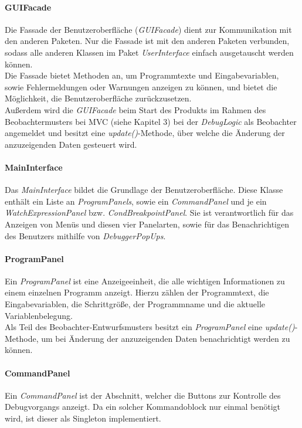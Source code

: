 \documentclass[parskip=full]{scrartcl}
\begin{document}
\paragraph{GUIFacade}
Die Fassade der Benutzeroberfläche (\textit{GUIFacade}) dient zur Kommunikation mit den anderen Paketen. Nur die Fassade ist mit den anderen Paketen verbunden, sodass alle anderen Klassen im Paket \textit{UserInterface} einfach ausgetauscht werden können. \\
Die Fassade bietet Methoden an, um Programmtexte und Eingabevariablen, sowie Fehlermeldungen oder Warnungen anzeigen zu können, und bietet die Möglichkeit, die Benutzeroberfläche zurückzusetzen. \\
Außerdem wird die \textit{GUIFacade} beim Start des Produkts im Rahmen des Beobachtermusters bei MVC (siehe Kapitel 3) bei der \textit{DebugLogic} als Beobachter angemeldet und besitzt eine \textit{update()}-Methode, über welche die Änderung der anzuzeigenden Daten gesteuert wird.
\paragraph{MainInterface}
 Das \textit{MainInterface} bildet die Grundlage der Benutzeroberfläche. Diese Klasse enthält ein Liste an \textit{ProgramPanels}, sowie ein \textit{CommandPanel} und je ein \textit{WatchExpressionPanel} bzw. \textit{CondBreakpointPanel}. Sie ist verantwortlich für das Anzeigen von Menüs und diesen vier Panelarten, sowie für das Benachrichtigen des Benutzers mithilfe von \textit{DebuggerPopUps}. 
\paragraph{ProgramPanel}
Ein \textit{ProgramPanel} ist eine Anzeigeeinheit, die alle wichtigen Informationen zu einem einzelnen Programm anzeigt. Hierzu zählen der Programmtext, die Eingabevariablen, die Schrittgröße, der Programmname und die aktuelle Variablenbelegung. \\
Als Teil des Beobachter-Entwurfsmusters besitzt ein \textit{ProgramPanel} eine \textit{update()}-Methode, um bei Änderung der anzuzeigenden Daten benachrichtigt werden zu können.
\paragraph{CommandPanel}
Ein \textit{CommandPanel} ist der Abschnitt, welcher die Buttons zur Kontrolle des Debugvorgangs anzeigt. Da ein solcher Kommandoblock nur einmal benötigt wird, ist dieser als Singleton implementiert. 
\end{document}
